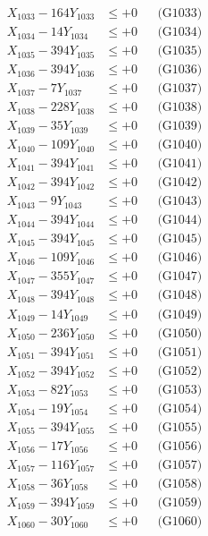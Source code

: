 \documentclass[a4paper,10pt]{article}
\begin{document}
{\begin{align}
X_{1033} - 164Y_{1033} &\leq +0 && \text{(G1033)} \\
X_{1034} - 14Y_{1034} &\leq +0 && \text{(G1034)} \\
X_{1035} - 394Y_{1035} &\leq +0 && \text{(G1035)} \\
X_{1036} - 394Y_{1036} &\leq +0 && \text{(G1036)} \\
X_{1037} - 7Y_{1037} &\leq +0 && \text{(G1037)} \\
X_{1038} - 228Y_{1038} &\leq +0 && \text{(G1038)} \\
X_{1039} - 35Y_{1039} &\leq +0 && \text{(G1039)} \\
X_{1040} - 109Y_{1040} &\leq +0 && \text{(G1040)} \\
\allowbreak
X_{1041} - 394Y_{1041} &\leq +0 && \text{(G1041)} \\
X_{1042} - 394Y_{1042} &\leq +0 && \text{(G1042)} \\
X_{1043} - 9Y_{1043} &\leq +0 && \text{(G1043)} \\
X_{1044} - 394Y_{1044} &\leq +0 && \text{(G1044)} \\
X_{1045} - 394Y_{1045} &\leq +0 && \text{(G1045)} \\
X_{1046} - 109Y_{1046} &\leq +0 && \text{(G1046)} \\
X_{1047} - 355Y_{1047} &\leq +0 && \text{(G1047)} \\
X_{1048} - 394Y_{1048} &\leq +0 && \text{(G1048)} \\
X_{1049} - 14Y_{1049} &\leq +0 && \text{(G1049)} \\
X_{1050} - 236Y_{1050} &\leq +0 && \text{(G1050)} \\
\allowbreak
X_{1051} - 394Y_{1051} &\leq +0 && \text{(G1051)} \\
X_{1052} - 394Y_{1052} &\leq +0 && \text{(G1052)} \\
X_{1053} - 82Y_{1053} &\leq +0 && \text{(G1053)} \\
X_{1054} - 19Y_{1054} &\leq +0 && \text{(G1054)} \\
X_{1055} - 394Y_{1055} &\leq +0 && \text{(G1055)} \\
X_{1056} - 17Y_{1056} &\leq +0 && \text{(G1056)} \\
X_{1057} - 116Y_{1057} &\leq +0 && \text{(G1057)} \\
X_{1058} - 36Y_{1058} &\leq +0 && \text{(G1058)} \\
X_{1059} - 394Y_{1059} &\leq +0 && \text{(G1059)} \\
X_{1060} - 30Y_{1060} &\leq +0 && \text{(G1060)} \\

\end{align}}
\end{document}
